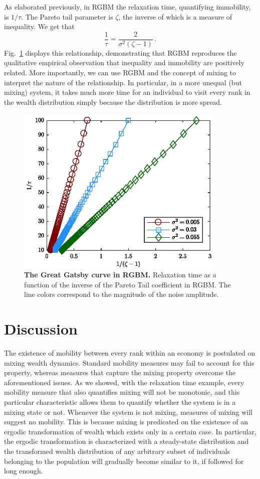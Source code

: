 \documentclass[11pt]{article}
\newcommand{\fref}[1]{Fig.~\ref{fig:#1}}
\newcommand{\be}{\begin{equation}}
\newcommand{\ee}{\end{equation}}
\numberwithin{equation}{section}
\begin{document}
As elaborated previously, in RGBM the relaxation time, quantifying immobility, is $1/\tau$. The Pareto tail parameter is $\zeta$, the inverse of which is a measure of inequality. We get that
%
\be
\frac{1}{\tau} = \frac{2}{\sigma^2\left(\zeta - 1\right)}\,.
\ee
%
\fref{rgbm-great-gatsby} displays this relationship, demonstrating that RGBM reproduces the qualitative empirical observation that inequality and immobility are positively related. More importantly, we can use RGBM and the concept of mixing to interpret the nature of the relationship. In particular, in a more unequal (but mixing) system, it takes much more time for an individual to visit every rank in the wealth distribution simply because the distribution is more spread. 

\begin{figure}[!htb]
\centering
\includegraphics[width=10cm]{figs/fig_great_gatsby.eps}
\caption{\textbf{The Great Gatsby curve in RGBM.} Relaxation time as a function of the inverse of the Pareto Tail coefficient in RGBM. The line colors correspond to the magnitude of the noise amplitude. 
\label{fig:rgbm-great-gatsby}}
\end{figure}

\FloatBarrier

\section{Discussion} \label{sec:discussion}

The existence of mobility between every rank within an economy is postulated on mixing wealth dynamics. Standard mobility measures may fail to account for this property, whereas measures that capture the mixing property overcome the aforementioned issues. As we showed, with the relaxation time example, every mobility measure that also quantifies mixing will not be monotonic, and this particular characteristic allows them to quantify whether the system is in a mixing state or not. Whenever the system is not mixing, measures of mixing will suggest no mobility. This is because mixing is predicated on the existence of an ergodic transformation of wealth which exists only in a certain case. In particular, the ergodic transformation is characterized with a steady-state distribution and the transformed wealth distribution of any arbitrary subset of individuals belonging to the population will gradually become similar to it, if followed for long enough.
\end{document}
